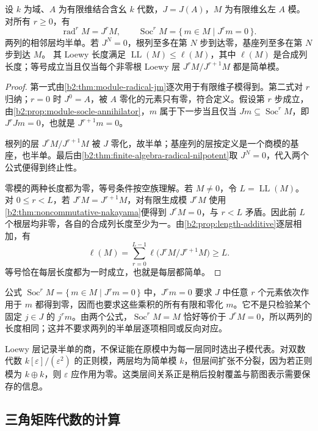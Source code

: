 \begin{proposition}\label{b2:prop:loewy-series}
	设 \(k\) 为域、\(A\) 为有限维结合含幺 \(k\) 代数，\(J=J(A)\)，\(M\) 为有限维幺左 \(A\) 模。对所有 \(r\ge0\)，有
	\[
		\operatorname{rad}^rM=J^rM,\qquad \operatorname{Soc}^rM=\{\,m\in M\mid J^rm=0\,\}.
	\]
	两列的相邻层均半单。若 \(J^N=0\)，根列至多在第 \(N\) 步到达零，基座列至多在第 \(N\) 步到达 \(M\)。 其 Loewy 长度满足 \(\operatorname{LL}(M)\le\ell(M)\)，其中 \(\ell(M)\) 是合成列长度；等号成立当且仅当每个非零根 Loewy 层 \(J^rM/J^{r+1}M\) 都是简单模。
\end{proposition}
\begin{proof}
	第一式由\cref{b2:thm:module-radical-jm}逐次用于有限维子模得到。第二式对 \(r\) 归纳；\(r=0\) 时 \(J^0=A\)，被 \(A\) 零化的元素只有零，符合定义。假设第 \(r\) 步成立，由\cref{b2:prop:module-socle-annihilator}，\(m\) 属于下一步当且仅当 \(Jm\subseteq\operatorname{Soc}^rM\)，即 \(J^rJm=0\)，也就是 \(J^{r+1}m=0\)。

	根列的层 \(J^rM/J^{r+1}M\) 被 \(J\) 零化，故半单；基座列的层按定义是一个商模的基座，也半单。最后由\cref{b2:thm:finite-algebra-radical-nilpotent}取 \(J^N=0\)，代入两个公式便得到终止性。

	零模的两种长度都为零，等号条件按空族理解。若 \(M\ne0\)，令 \(L=\operatorname{LL}(M)\)。对 \(0\le r<L\)，若 \(J^rM=J^{r+1}M\)，对有限生成模 \(J^rM\) 使用\cref{b2:thm:noncommutative-nakayama}便得到 \(J^rM=0\)，与 \(r<L\) 矛盾。因此前 \(L\) 个根层均非零，各自的合成列长度至少为一。由\cref{b2:prop:length-additive}逐层相加，有
	\[
		\ell(M)=\sum_{r=0}^{L-1}\ell\bigl(J^rM/J^{r+1}M\bigr)\ge L.
	\]
	等号恰在每层长度都为一时成立，也就是每层都简单。
\end{proof}

公式 \(\operatorname{Soc}^rM=\{\,m\in M\mid J^rm=0\,\}\) 中，\(J^rm=0\) 要求 \(J\) 中任意 \(r\) 个元素依次作用于 \(m\) 都得到零，因而也要求这些乘积的所有有限和零化 \(m\)。它不是只检验某个固定 \(j\in J\) 的 \(j^rm\)。由两个公式，\(\operatorname{Soc}^rM=M\) 恰好等价于 \(J^rM=0\)，所以两列的长度相同；这并不要求两列的半单层逐项相同或反向对应。

\ProseParagraphBreak
Loewy 层记录半单的商，不保证能在原模中为每一层同时选出子模代表。对双数代数 \(k[\varepsilon]/(\varepsilon^2)\) 的正则模，两层均为简单模 \(k\)，但层间扩张不分裂，因为若正则模为 \(k\oplus k\)，则 \(\varepsilon\) 应作用为零。这类层间关系正是稍后投射覆盖与箭图表示需要保存的信息。

\subsection{三角矩阵代数的计算}
\label{b2:subsec:1502:03}

